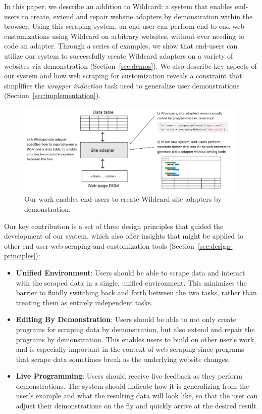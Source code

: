 \documentclass[sigconf,10pt]{acmart}
\providecommand{\tightlist}{%
  \setlength{\itemsep}{0pt}\setlength{\parskip}{0pt}}
\begin{document}
In this paper, we describe an addition to Wildcard: a system that
enables end-users to create, extend and repair website adapters by
demonstration within the browser. Using this scraping system, an
end-user can perform end-to-end web customizations using Wildcard on
arbitrary websites, without ever needing to code an adapter. Through a
series of examples, we show that end-users can utilize our system to
successfully create Wildcard adapters on a variety of websites via
demonstration (Section~\ref{sec:demos}). We also describe key aspects of
our system and how web scraping for customization reveals a constraint
that simplifies the \emph{wrapper induction} \citep{kushmerick2000} task
used to generalize user demonstrations
(Section~\ref{sec:implementation}).

\begin{figure}
  \includegraphics[width=\textwidth]{media/overview.png}
  \caption{\label{fig:overview}Our work enables end-users to create Wildcard site adapters by demonstration.}
\end{figure}

Our key contribution is a set of three design principles that guided the
development of our system, which also offer insights that might be
applied to other end-user web scraping and customization tools
(Section~\ref{sec:design-principles}):

\begin{itemize}
\tightlist
\item
  \textbf{Unified Environment}: Users should be able to scrape data and
  interact with the scraped data in a single, unified environment. This
  minimizes the barrier to fluidly switching back and forth between the
  two tasks, rather than treating them as entirely independent tasks.
\item
  \textbf{Editing By Demonstration}: Users should be able to not only
  create programs for scraping data by demonstration, but also extend
  and repair the programs by demonstration. This enables users to build
  on other user's work, and is especially important in the context of
  web scraping since programs that scrape data sometimes break as the
  underlying website changes.
\item
  \textbf{Live Programming}: Users should receive live feedback as they
  perform demonstrations. The system should indicate how it is
  generalizing from the user's example and what the resulting data will
  look like, so that the user can adjust their demonstrations on the fly
  and quickly arrive at the desired result.
\end{itemize}
\end{document}
